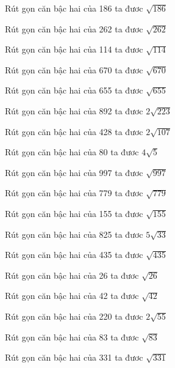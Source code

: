 \documentclass[12pt,a4paper]{article}
\begin{document}
\begin{ex}
Rút gọn căn bậc hai của 186 ta đươc $\sqrt{186}$
\end{ex}
\begin{ex}
Rút gọn căn bậc hai của 262 ta đươc $\sqrt{262}$
\end{ex}
\begin{ex}
Rút gọn căn bậc hai của 114 ta đươc $\sqrt{114}$
\end{ex}
\begin{ex}
Rút gọn căn bậc hai của 670 ta đươc $\sqrt{670}$
\end{ex}
\begin{ex}
Rút gọn căn bậc hai của 655 ta đươc $\sqrt{655}$
\end{ex}
\begin{ex}
Rút gọn căn bậc hai của 892 ta đươc $2\sqrt{223}$
\end{ex}
\begin{ex}
Rút gọn căn bậc hai của 428 ta đươc $2\sqrt{107}$
\end{ex}
\begin{ex}
Rút gọn căn bậc hai của 80 ta đươc $4\sqrt{5}$
\end{ex}
\begin{ex}
Rút gọn căn bậc hai của 997 ta đươc $\sqrt{997}$
\end{ex}
\begin{ex}
Rút gọn căn bậc hai của 779 ta đươc $\sqrt{779}$
\end{ex}
\begin{ex}
Rút gọn căn bậc hai của 155 ta đươc $\sqrt{155}$
\end{ex}
\begin{ex}
Rút gọn căn bậc hai của 825 ta đươc $5\sqrt{33}$
\end{ex}
\begin{ex}
Rút gọn căn bậc hai của 435 ta đươc $\sqrt{435}$
\end{ex}
\begin{ex}
Rút gọn căn bậc hai của 26 ta đươc $\sqrt{26}$
\end{ex}
\begin{ex}
Rút gọn căn bậc hai của 42 ta đươc $\sqrt{42}$
\end{ex}
\begin{ex}
Rút gọn căn bậc hai của 220 ta đươc $2\sqrt{55}$
\end{ex}
\begin{ex}
Rút gọn căn bậc hai của 83 ta đươc $\sqrt{83}$
\end{ex}
\begin{ex}
Rút gọn căn bậc hai của 331 ta đươc $\sqrt{331}$
\end{ex}
\end{document}
